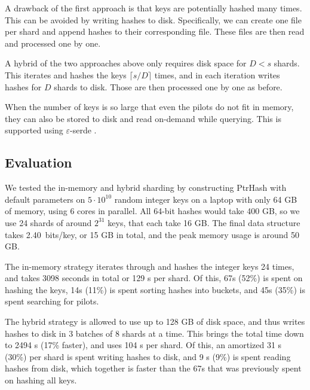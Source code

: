 \documentclass[a4paper,UKenglish,cleveref,thm-restate]{lipics-v2021}
\begin{document}
A drawback of the first approach is that keys are potentially hashed many times.
This can be avoided by writing hashes to disk. Specifically, we can create one
file per shard and append hashes to their corresponding file.
These files are then read and processed one by one.

 A hybrid of the two approaches above only requires disk space
for \(D<s\) shards. This iterates and hashes the keys \(\lceil s/D\rceil\) times,
and in each iteration writes hashes for \(D\) shards to disk. Those are then
processed one by one as before.

When the number of keys is so large that even the pilots do not fit in memory, they
can also be stored to disk and read on-demand while querying. This is supported using $\varepsilon$-serde \cite{epserde,webgraph}.
\subsection{Evaluation}
\label{sharding-eval}
We tested the in-memory and hybrid sharding by constructing PtrHash with default
parameters on \(5\cdot
10^{10}\) random integer keys on a laptop with only 64 GB of memory, using 6 cores
in parallel.
All 64-bit hashes would take 400 GB, so we use 24 shards of
around \(2^{31}\) keys, that each take 16 GB.
The final data structure takes 2.40~bits/key, or 15 GB in total, and the
peak memory usage is around 50 GB.

The in-memory strategy iterates through and hashes the integer keys 24 times, and takes
3098 seconds in total or 129 s per shard. Of this, 67s (52\%) is spent on hashing
the keys, 14s (11\%) is spent sorting hashes into buckets, and 45s (35\%) is spent
searching for pilots.

The hybrid strategy is allowed to use up to 128 GB of disk space, and thus writes
hashes to disk in 3 batches of 8 shards at a time. This brings the total time
down to 2494 s (17\% faster), and uses 104 s per shard. Of this, an amortized 31
s (30\%) per shard is spent
writing hashes to disk, and 9 s (9\%) is spent reading hashes from disk, which
together is faster than the 67s that was previously spent on hashing all keys.
\end{document}
